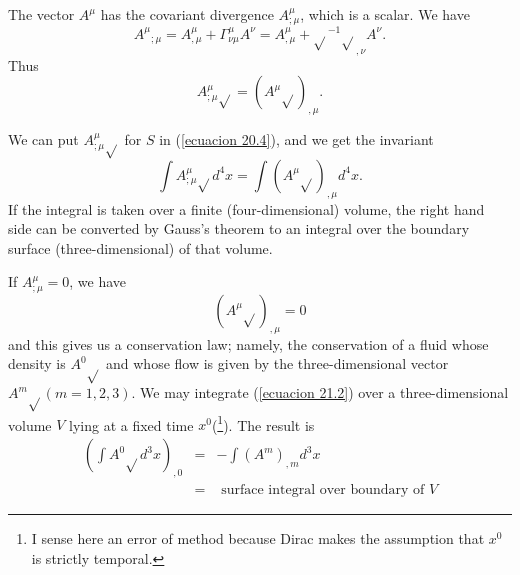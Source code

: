 The vector $A^\mu$ has the covariant divergence $A^\mu_{;\mu}$, which is a scalar. We have
\[
    {A^\mu}_{;\mu} = A^\mu_{,\mu} + \Gamma^\mu_{\nu\mu} A^\nu = A^\mu_{,\mu}+\sqrt{}^{-1}\sqrt{}_{,\nu}A^\nu.
\]
Thus
\begin{equation}
 \label{ecuacion 21.1}
 A^\mu_{;\mu} \sqrt{} = \left( A^\mu \sqrt{} \right)_{,\mu}.
\end{equation}

We can put $A^\mu_{;\mu}\sqrt{}$ for $S$ in (\ref{ecuacion 20.4}), and we get the invariant
\[
 \int {A^\mu_{;\mu}\sqrt{} d^4 x}
  = \int { \left(A^\mu \sqrt{}\right)_{,\mu} d^4 x}.
\]
If the integral is taken over a finite (four-dimensional) volume, the right hand side can be converted by Gauss's 
theorem to an integral over the boundary surface (three-dimensional) of that volume.

If $A^\mu_{;\mu}=0$, we have 
\begin{equation}
 \label{ecuacion 21.2}
 \left( A^\mu \sqrt{}\right)_{,\mu} = 0
\end{equation}
and this gives us a conservation law; namely, the conservation of a fluid whose density is $A^0\sqrt{}$ and whose flow 
is given by the three-dimensional vector $A^m\sqrt{}(m=1,2,3)$. We may integrate (\ref{ecuacion 21.2}) over a 
three-dimensional volume $V$ lying at a fixed time $x^0$(\footnote{I sense here an error of method because Dirac makes 
the assumption that $x^0$ is strictly temporal.}). The result is
\[
\begin{array}{rcl}
    \left(\int{A^0\sqrt{}d^3x}\right)_{,0} & = & - \int{\left(A^m\right)_{,m}d^3 x} \\
                               & = & \mbox{ surface integral over boundary of } V
\end{array} 
\]

